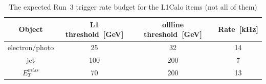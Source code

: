 \begin{table}[h]
	\caption{The expected Run~3 trigger rate budget for the L1Calo items (not all of them)}
	\renewcommand{\arraystretch}{1.3}
	\centering
	\begin{tabular}{| c | c | c | c | }
		\hline
		\hline
		Object           &    L1 threshold~[GeV]    &   offline threshold~[GeV] & Rate~[kHz]   \\
		\hline
		electron/photo   &     25                   &   32                      & 14          \\
		\hline
		jet              &     100                 & 200                        &  7        \\
		\hline
		$E^{miss}_{T}$   &     70                  & 200                      &  13                       \\
		\hline
		\hline
	\end{tabular}
	\label{Tab:trig_rate}
\end{table}
